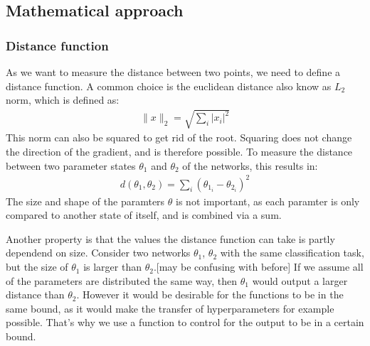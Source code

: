 \subsection{Mathematical approach}
\subsubsection{Distance function}\label{distance_function}
As we want to measure the distance between two points, we need to define a
distance function. A common choice is the euclidean distance also know as $L_2$
norm, which is defined as: 
\begin{align}
    \rVert x \lVert_2 = \sqrt{\sum_i \lvert x_i \rvert^2}
\end{align}
This norm can also be squared to get rid of the root. Squaring does not change
the direction of the gradient, and is therefore possible. To measure the
distance between two parameter states $\theta_1$ and $\theta_2$ of the networks,
this results in:
\begin{align}\label{eq:distance}
    d(\theta_1, \theta_2)= \sum_i (\theta_{1_i}-\theta_{2_i})^2
\end{align}
The size and shape of the paramters $\theta$ is not important, as each paramter
is only compared to another state of itself, and is combined via a sum.

Another property is that the values the distance function can take is partly
dependend on size. Consider two networks $\theta_1$, $\theta_2$ with the same
classification task, but the size of $\theta_1$ is larger than $\theta_2$.[may
be confusing with before] If we assume all of the parameters are distributed the
same way, then $\theta_1$ would output a larger distance than $\theta_2$.
However it would be desirable for the functions to be in the same bound, as it
would make the transfer of hyperparameters for example possible. That's why we
use a function to control for the output to be in a certain bound.

